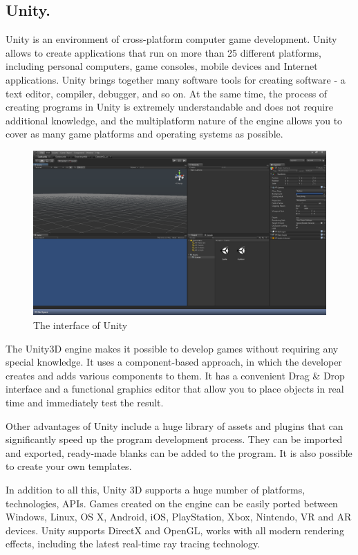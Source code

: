 \documentclass[thesis=B,english]{FITthesis}[2019/12/23]
\begin{document}
\subsection{Unity.}
Unity is an environment of cross-platform computer game development. Unity allows to create applications that run on more than 25 different platforms, including personal computers, game consoles, mobile devices and Internet applications. 
Unity brings together many software tools for creating software - a text editor, compiler, debugger, and so on. At the same time, the process of creating programs in Unity is extremely understandable and does not require additional knowledge, and the multiplatform nature of the engine allows you to cover as many game platforms and operating systems as possible. 

\begin{figure}[ht]
            \includegraphics[width=\textwidth]{unity.png}
            \caption{The interface of Unity}
            \label{fig:Unity}
\end{figure}

The Unity3D engine makes it possible to develop games without requiring any special knowledge. It uses a component-based approach, in which the developer creates and adds various components to them. It has a convenient Drag \& Drop interface and a functional graphics editor that allow you to place objects in real time and immediately test the result.

Other advantages of Unity include a huge library of assets and plugins that can significantly speed up the program development process. They can be imported and exported, ready-made blanks can be added to the program. It is also possible to create your own templates.

In addition to all this, Unity 3D supports a huge number of platforms, technologies, APIs. Games created on the engine can be easily ported between Windows, Linux, OS X, Android, iOS, PlayStation, Xbox, Nintendo, VR and AR devices. Unity supports DirectX and OpenGL, works with all modern rendering effects, including the latest real-time ray tracing technology.
\end{document}
